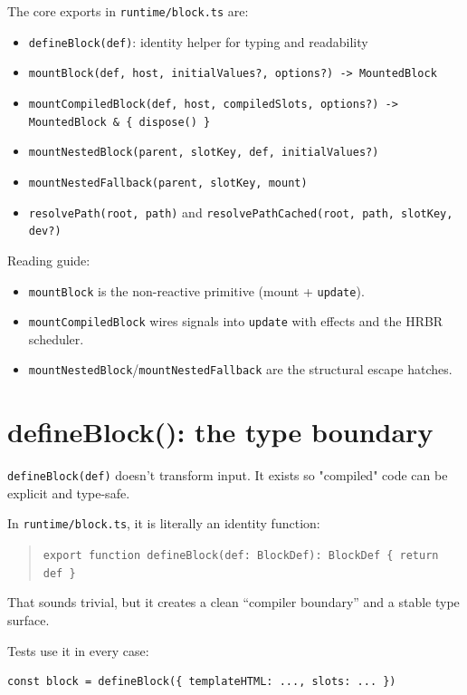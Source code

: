 The core exports in \texttt{runtime/block.ts} are:

\begin{itemize}
  \item \texttt{defineBlock(def)}: identity helper for typing and readability
  \item \texttt{mountBlock(def, host, initialValues?, options?) -> MountedBlock}
  \item \texttt{mountCompiledBlock(def, host, compiledSlots, options?) -> MountedBlock \& \{ dispose() \}}
  \item \texttt{mountNestedBlock(parent, slotKey, def, initialValues?)}
  \item \texttt{mountNestedFallback(parent, slotKey, mount)}
  \item \texttt{resolvePath(root, path)} and \texttt{resolvePathCached(root, path, slotKey, dev?)}
\end{itemize}

Reading guide:

\begin{itemize}
  \item \texttt{mountBlock} is the non-reactive primitive (mount + \texttt{update}).
  \item \texttt{mountCompiledBlock} wires signals into \texttt{update} with effects and the HRBR scheduler.
  \item \texttt{mountNestedBlock}/\texttt{mountNestedFallback} are the structural escape hatches.
\end{itemize}

\section{defineBlock(): the type boundary}

	\texttt{defineBlock(def)} doesn’t transform input. It exists so "compiled" code can be explicit and type-safe.

In \texttt{runtime/block.ts}, it is literally an identity function:

\begin{quote}
	\texttt{export function defineBlock(def: BlockDef): BlockDef \{ return def \}}
\end{quote}

That sounds trivial, but it creates a clean “compiler boundary” and a stable type surface.

Tests use it in every case:

\begin{verbatim}
const block = defineBlock({ templateHTML: ..., slots: ... })
\end{verbatim}

